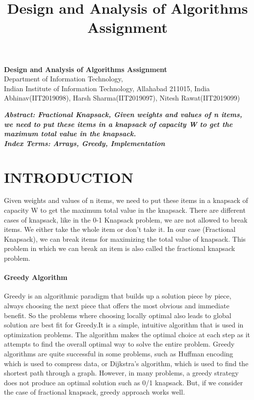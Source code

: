 \documentclass[10pt]{article}
\author{}
\title{\Large{Design and Analysis of Algorithms Assignment}}
\begin{document}
	
	\begin{center}
		{\Large \textbf{Design and Analysis of Algorithms Assignment}}\\
		\vspace{1em}
		{\large Department of Information Technology,}\\
		\vspace{1em}
		\large{Indian Institute of Information Technology, Allahabad 211015, India}\\
		\vspace{1em}
		\large{Abhinav(IIT2019098), Harsh Sharma(IIT2019097), Nitesh Rawat(IIT2019099)}
		\vspace{2.5em}
		
	\end{center}
	
\begin{multicols*}{2}

    \textbf{\emph{{Abstract}: Fractional Knapsack, Given weights and values of n items, we need to put these items in a knapsack of capacity W to get the maximum total value in the knapsack.}}\\
	
	\textbf{\emph{{Index Terms}: Arrays, Greedy, Implementation\\}}


\section*{INTRODUCTION}

Given weights and values of n items, we need to put these items in a knapsack of capacity W to get the maximum total value in the knapsack. There are different cases of knapsack, like in the 0-1 Knapsack problem, we are not allowed to break items. We either take the whole item or don’t take it. In our case (Fractional Knapsack), we can break items for maximizing the total value of knapsack. This problem in which we can break an item is also called the fractional knapsack problem. 

\paragraph{Greedy Algorithm}
Greedy is an algorithmic paradigm that builds up a solution piece by piece, always choosing the next piece that offers the most obvious and immediate benefit. So the problems where choosing locally optimal also leads to global solution are best fit for Greedy.It is a simple, intuitive algorithm that is used in optimization problems. The algorithm makes the optimal choice at each step as it attempts to find the overall optimal way to solve the entire problem. Greedy algorithms are quite successful in some problems, such as Huffman encoding which is used to compress data, or Dijkstra's algorithm, which is used to find the shortest path through a graph.
However, in many problems, a greedy strategy does not produce an optimal solution such as 0/1 knapsack.
But, if we consider the case of fractional knapsack, greedy approach works well.


\end{multicols*}
\end{document}
